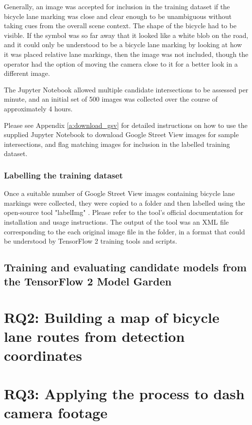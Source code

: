 \documentclass[11pt,twoside]{report}
\begin{document}
Generally, an image was accepted for inclusion in the training dataset if the bicycle lane marking was close and clear enough to be unambiguous without taking cues from the overall scene context.  The shape of the bicycle had to be visible.  If the symbol was so far away that it looked like a white blob on the road, and it could only be understood to be a bicycle lane marking by looking at how it was placed relative lane markings, then the image was not included, though the operator had the option of moving the camera close to it for a better look in a different image.

The Jupyter Notebook allowed multiple candidate intersections to be assessed per minute, and an initial set of 500 images was collected over the course of approximately 4 hours.

Please see Appendix \ref{a:download_gsv} for detailed instructions on how to use the supplied Jupyter Notebook to download Google Street View images for sample intersections, and flag matching images for inclusion in the labelled training dataset.

\subsubsection{Labelling the training dataset}

Once a suitable number of Google Street View images containing bicycle lane markings were collected, they were copied to a folder and then labelled using the open-source tool "labelImg" \cite{labelImg}.  Please refer to the tool's official documentation for installation and usage instructions.  The output of the tool was an XML file corresponding to the each original image file in the folder, in a format that could be understood by TensorFlow 2 training tools and scripts.

\subsection{Training and evaluating candidate models from the TensorFlow 2 Model Garden}




\section{RQ2: Building a map of bicycle lane routes from detection coordinates}


\section{RQ3: Applying the process to dash camera footage}
\end{document}
